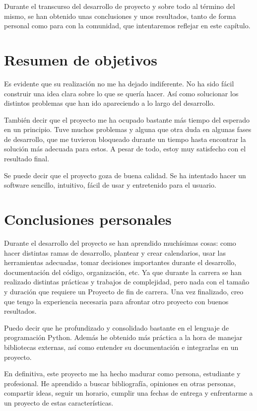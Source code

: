 
Durante el transcurso del desarrollo de proyecto y sobre todo al término del mismo,
se han obtenido unas conclusiones y unos resultados, tanto de forma personal
como para con la comunidad, que intentaremos reflejar en este capítulo.


\section{Resumen de objetivos}

Es evidente que su realización no me ha dejado indiferente. No ha sido fácil construir una idea
clara sobre lo que se quería hacer. Así como solucionar los distintos problemas que han ido apareciendo
a lo largo del desarrollo.

También decir que el proyecto me ha ocupado bastante más tiempo del esperado en un principio. Tuve
muchos problemas y alguna que otra duda en algunas fases de desarrollo, que me tuvieron
bloqueado durante un tiempo hasta encontrar la solución más adecuada para estos. A pesar de todo,
estoy muy satisfecho con el resultado final.

Se puede decir que el proyecto goza de buena calidad. Se ha intentado hacer un software sencillo,
intuitivo, fácil de usar y entretenido para el usuario.

\section{Conclusiones personales}

Durante el desarrollo del proyecto se han aprendido muchísimas cosas: como hacer distintas ramas de
desarrollo, plantear y crear calendarios, usar las herramientas adecuadas, tomar decisiones importantes
durante el desarrollo, documentación del código, organización, etc. Ya que durante la carrera se
han realizado distintas prácticas y trabajos de complejidad, pero nada con el tamaño y duración que
requiere un Proyecto de fin de carrera. Una vez finalizado, creo que tengo la experiencia necesaria
para afrontar otro proyecto con buenos resultados.

Puedo decir que he profundizado y consolidado bastante en el lenguaje de programación Python.
Además he obtenido más práctica a la hora de manejar bibliotecas
externas, así como entender su documentación e integrarlas en un proyecto.

En definitiva, este proyecto me ha hecho madurar como persona, estudiante y profesional. He aprendido a buscar
bibliografía, opiniones en otras personas, compartir ideas, seguir un horario, cumplir una fechas de
entrega y enfrentarme a un proyecto de estas características.

